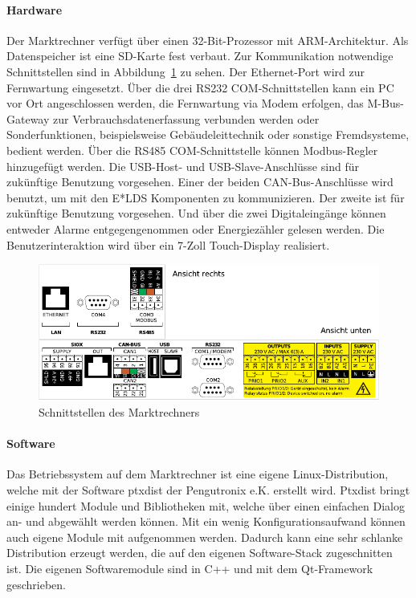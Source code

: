 \documentclass[11pt,a4paper]{report}
\begin{document}
\paragraph{Hardware} Der Marktrechner verfügt über einen 32-Bit-Prozessor mit ARM-Architektur. Als Datenspeicher ist eine SD-Karte fest verbaut. Zur Kommunikation notwendige Schnittstellen sind in Abbildung~\ref{fig:marktrechner_interfaces} zu sehen. Der Ethernet-Port wird zur Fernwartung eingesetzt. Über die drei RS232 COM-Schnittstellen kann ein PC vor Ort angeschlossen werden, die Fernwartung via Modem erfolgen, das M-Bus-Gateway zur Verbrauchsdatenerfassung verbunden werden oder Sonderfunktionen, beispielsweise Gebäudeleittechnik oder sonstige Fremdsysteme, bedient werden. Über die RS485 COM-Schnittstelle können Modbus-Regler hinzugefügt werden. Die USB-Host- und USB-Slave-Anschlüsse sind für zukünftige Benutzung vorgesehen. Einer der beiden CAN-Bus-Anschlüsse wird benutzt, um mit den E*LDS Komponenten zu kommunizieren. Der zweite ist für zukünftige Benutzung vorgesehen. Und über die zwei Digitaleingänge können entweder Alarme entgegengenommen oder Energiezähler gelesen werden. Die Benutzerinteraktion wird über ein 7-Zoll Touch-Display realisiert.

\begin{figure}[htbp]
\centering
\includegraphics[scale=1.1]{images/CI4000_Hardware_Sticker.pdf}
\caption{Schnittstellen des Marktrechners}
\label{fig:marktrechner_interfaces}
\end{figure}

\paragraph{Software}

Das Betriebssystem auf dem Marktrechner ist eine eigene Linux-Distribution, welche mit der Software ptxdist der  Pengutronix e.K. erstellt wird. Ptxdist bringt einige hundert Module und Bibliotheken mit, welche über einen einfachen Dialog an- und abgewählt werden können. Mit ein wenig Konfigurationsaufwand können auch eigene Module mit aufgenommen werden. Dadurch kann eine sehr schlanke Distribution erzeugt werden, die  auf den eigenen Software-Stack zugeschnitten ist. Die eigenen Softwaremodule sind in C++ und mit dem Qt-Framework geschrieben. 
\end{document}
